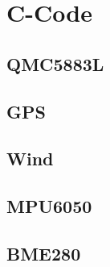 \section{C-Code}\label{cha:C-Code}

\subsection{QMC5883L}\label{ssec:QMC5883L}

\subsection{GPS}\label{ssec:GPS}

\subsection{Wind}\label{ssec:Wind}

\subsection{MPU6050}\label{ssec:MPU6050}

\subsection{BME280}\label{ssec:BME280}
 